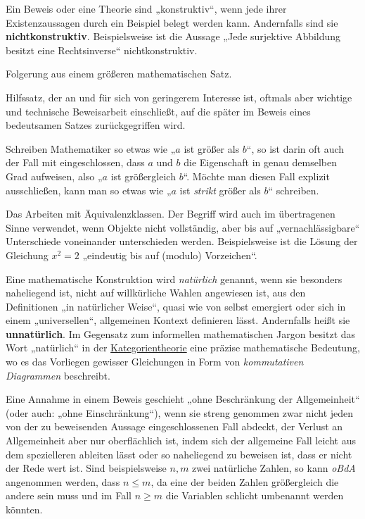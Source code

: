 \begin{description}[labelindent=0pt, leftmargin=0pt]
    \item[Konstruktiv:] Ein Beweis oder eine Theorie sind „konstruktiv“, wenn jede ihrer Existenzaussagen durch ein Beispiel belegt werden kann. Andernfalls sind sie \textbf{nichtkonstruktiv}. Beispielsweise ist die Aussage „Jede surjektive Abbildung besitzt eine Rechtsinverse“ nichtkonstruktiv.
    
    \item[Korollar:] Folgerung aus einem größeren mathematischen Satz.

    \item[Lemma:] Hilfssatz, der an und für sich von geringerem Interesse ist, oftmals aber wichtige und technische Beweisarbeit einschließt, auf die später im Beweis eines bedeutsamen Satzes zurückgegriffen wird.

    \item[Mathematischer Komparativ:] Schreiben Mathematiker so etwas wie „$a$ ist größer als $b$“, so ist darin oft auch der Fall mit eingeschlossen, dass $a$ und $b$ die Eigenschaft in genau demselben Grad aufweisen, also „$a$ ist größergleich $b$“. Möchte man diesen Fall explizit ausschließen, kann man so etwas wie „$a$ ist \emph{strikt} größer als $b$“ schreiben.
    
    \item[Modulo:] Das Arbeiten mit Äquivalenzklassen. Der Begriff wird auch im übertragenen Sinne verwendet, wenn Objekte nicht vollständig, aber bis auf „vernachlässigbare“ Unterschiede voneinander unterschieden werden. Beispielsweise ist die Lösung der Gleichung $x^2=2$ „eindeutig bis auf (\glq modulo\grq) Vorzeichen“.

    \item[Natürlich:] Eine mathematische Konstruktion wird \emph{natürlich} genannt, wenn sie besonders naheliegend ist, nicht auf willkürliche Wahlen angewiesen ist, aus den Definitionen „in natürlicher Weise“, quasi wie von selbst emergiert oder sich in einem „universellen“, allgemeinen Kontext definieren lässt. Andernfalls heißt sie \textbf{unnatürlich}. Im Gegensatz zum informellen mathematischen Jargon besitzt das Wort „natürlich“ in der \href{https://ncatlab.org/nlab/show/category+theory}{Kategorientheorie} eine präzise mathematische Bedeutung, wo es das Vorliegen gewisser Gleichungen in Form von \emph{kommutativen Diagrammen} beschreibt.

    \item[Ohne Beschränkung der Allgemeinheit (OBdA):] Eine Annahme in einem Beweis geschieht „ohne Beschränkung der Allgemeinheit“ (oder auch: „ohne Einschränkung“), wenn sie streng genommen zwar nicht jeden von der zu beweisenden Aussage eingeschlossenen Fall abdeckt, der Verlust an Allgemeinheit aber nur oberflächlich ist, indem sich der allgemeine Fall leicht aus dem spezielleren ableiten lässt oder so naheliegend zu beweisen ist, dass er nicht der Rede wert ist. Sind beispielsweise $n,m$ zwei natürliche Zahlen, so kann \emph{oBdA} angenommen werden, dass $n\le m$, da eine der beiden Zahlen größergleich die andere sein muss und im Fall $n\ge m$ die Variablen schlicht umbenannt werden könnten.


\end{description}
